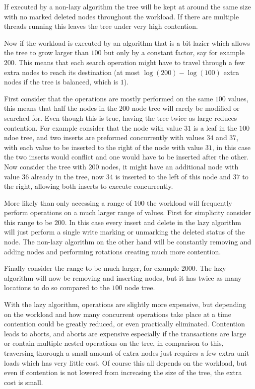 \documentclass[10pt]{sigplanconf}
\begin{document}
If executed by a non-lazy algorithm the tree will be kept at around the same size with no marked deleted nodes throughout the workload.
If there are multiple threads running this leaves the tree under very high contention.

Now if the workload is executed by an algorithm that is a bit lazier which allows the tree to grow larger than $100$ but only by a constant factor, say for example $200$.
This means that each search operation might have to travel through a few extra nodes to reach its destination (at most $\log(200) - \log(100)$ extra nodes if the tree is balanced, which is $1$).

First consider that the operations are mostly performed on the same $100$ values, this means that half the nodes in the $200$ node tree will rarely be modified or searched for.
Even though this is true, having the tree twice as large reduces contention.
For example consider that the node with value $31$ is a leaf in the $100$ ndoe tree, and two inserts are preformed concurrently with values $34$ and $37$, with each value to be inserted to the right
of the node with value $31$, in this case the two inserts would conflict and one would have to be inserted after the other.
Now consider the tree with $200$ nodes, it might have an additional node with value $36$ already in the tree, now $34$ is inserted to the left of this node and $37$ to the right, allowing both inserts to
execute concurrently.

More likely than only accessing a range of $100$ the workload will frequently perform operations on a much larger range of values.
First for simplicity consider this range to be $200$.
In this case every insert and delete in the lazy algorithm will just perform a single write marking or unmarking the deleted status of the node.
The non-lazy algorithm on the other hand will be constantly removing and adding nodes and performing rotations creating much more contention.

Finally consider the range to be much larger, for example $2000$.
The lazy algorithm will now be removing and inserting nodes, but it has twice as many locations to do so compared to the $100$ node tree.

With the lazy algorithm, operations are slightly more expensive, but depending on the workload and how many concurrent operations take place at a time
contention could be greatly reduced, or even practically eliminated.
Contention leads to aborts, and aborts are expensive especially if the transactions are large or contain multiple nested operations on the tree, in comparison to this, traversing
thorough a small amount of extra nodes just requires a few extra unit loads which has very little cost.
Of course this all depends on the workload, but even if contention is not lowered from increasing the size of the tree, the extra cost is small.
\end{document}
